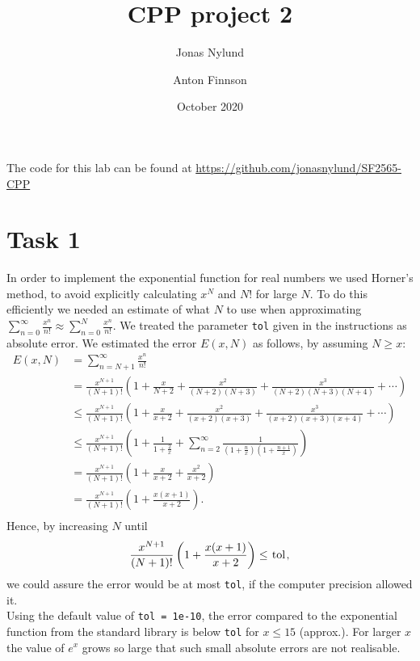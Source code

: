\documentclass[12pt]{article}
\title{CPP project 2}
\author{Jonas Nylund \and Anton Finnson}
\date{October 2020}
\begin{document}
\maketitle

The code for this lab can be found at \href{https://github.com/jonasnylund/SF2565-CPP}{https://github.com/jonasnylund/SF2565-CPP}

% 

\section{Task 1}
In order to implement the exponential function for real numbers we used Horner's method, to avoid explicitly calculating $x^N$ and $N!$ for large $N$. To do this efficiently we needed an estimate of what $N$ to use when approximating $\sum_{n=0}^\infty \frac{x^n}{n!} \approx \sum_{n=0}^N \frac{x^n}{n!}.$ We treated the parameter \lstinline{tol} given in the instructions as absolute error. We estimated the error $E(x, N)$ as follows, by assuming $N \geq x$:
\begin{align*}
    E(x, N) &= \sum_{n = N+1}^\infty \frac{x^n}{n!}\\ &=\frac{x^{N+1}}{(N+1)!}\left(1 + \frac{x}{N+2} + \frac{x^2}{(N+2)(N+3)}
    + \frac{x^3}{(N+2)(N+3)(N+4)} + \cdots \right)\\
    &\leq \frac{x^{N+1}}{(N+1)!}\left(1 + \frac{x}{x+2} + \frac{x^2}{(x+2)(x+3)}
    + \frac{x^3}{(x+2)(x+3)(x+4)} + \cdots\right)\\
    &\leq \frac{x^{N+1}}{(N+1)!}\left(1 + \frac{1}{1 + \frac{2}{x}} + \sum_{n = 2}^\infty \frac{1}{(1+\frac{n}{x})(1 + \frac{n+1}{x})} \right)\\
    &= \frac{x^{N+1}}{(N+1)!}\left(1 + \frac{x}{x + 2} + \frac{x^2}{x+2}\right)\\
    &= \frac{x^{N+1}}{(N+1)!}\left(1 + \frac{x(x+1)}{x + 2}\right).\\
\end{align*}
Hence, by increasing $N$ until 
\begin{align*}
    \frac{x^{N+1}}{(N+1)!}\left(1 + \frac{x(x+1)}{x + 2}\right) \leq \lstinline{tol},
\end{align*}
we could assure the error would be at most \lstinline{tol}, if the computer precision allowed it.\\

Using the default value of \lstinline{tol = 1e-10}, the error compared to the exponential function from the standard library is below \lstinline{tol} for $x \leq 15$  (approx.). For larger $x$ the value of $e^x$ grows so large that such small absolute errors are not realisable.
\end{document}
